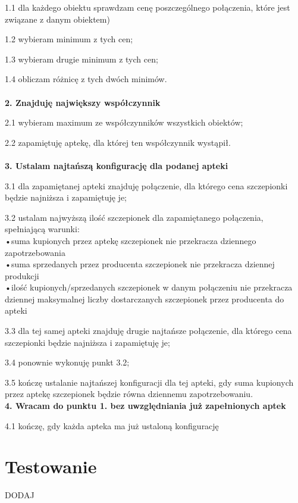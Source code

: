 \documentclass[]{article}
\begin{document}
    1.1 dla każdego obiektu sprawdzam cenę poszczególnego połączenia, które jest związane z danym obiektem)
    
    1.2 wybieram minimum z tych cen;
    
    1.3 wybieram drugie minimum z tych cen;
    
    1.4 obliczam różnicę z tych dwóch minimów.\\\\ 
    \textbf{2. Znajduję największy współczynnik}
    
    2.1 wybieram maximum ze współczynników wszystkich obiektów;
    
    2.2 zapamiętuję aptekę, dla której ten współczynnik wystąpił.\\\\
    \textbf{3. Ustalam najtańszą konfigurację dla podanej apteki}
    
    3.1 dla zapamiętanej apteki znajduję połączenie, dla którego cena szczepionki będzie najniższa i zapamiętuję je;
    
    3.2 ustalam najwyższą ilość szczepionek dla zapamiętanego połączenia, spełniającą warunki:\\
    \tab •suma kupionych przez aptekę szczepionek nie przekracza dziennego \\\tab zapotrzebowania\\
    \tab •suma sprzedanych przez producenta szczepionek nie przekracza dziennej produkcji\\
     \tab •ilość kupionych/sprzedanych szczepionek w danym połączeniu nie przekracza\\\tab  dziennej maksymalnej liczby dostarczanych szczepionek przez producenta do apteki
     
     3.3 dla tej samej apteki znajduję drugie najtańsze połączenie, dla którego cena szczepionki będzie najniższa i zapamiętuję je;
     
     3.4 ponownie wykonuję punkt 3.2;
     
     3.5 kończę ustalanie najtańszej konfiguracji dla tej apteki, gdy suma kupionych przez aptekę szczepionek będzie równa dziennemu zapotrzebowaniu.\\
     \textbf{4. Wracam do punktu 1.  bez uwzględniania już zapełnionych aptek}
     
     4.1 kończę, gdy każda apteka ma już ustaloną konfigurację
     
     
    \section{Testowanie}
    DODAJ
\end{document}
